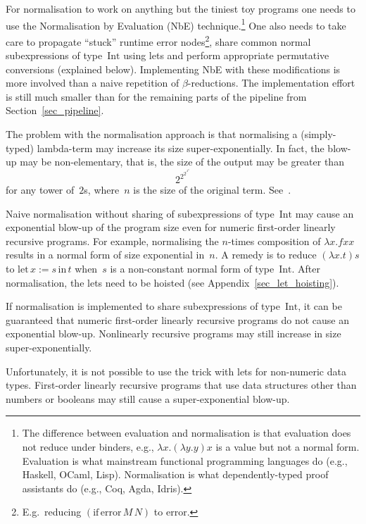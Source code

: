 \documentclass[
    9pt,            %
    techreport,        %
    affiltop,       %
]{art}
\begin{document}
For normalisation to work on anything but the tiniest toy programs one
needs to use the Normalisation by Evaluation (NbE)
technique.\footnote{The difference between evaluation and
normalisation is that evaluation does not reduce under binders, e.g.,
$\lambda x . (\lambda y . y) x$ is a value but not a normal
form. Evaluation is what mainstream functional programming languages
do (e.g., Haskell, OCaml, Lisp). Normalisation is what
dependently-typed proof assistants do (e.g., Coq, Agda, Idris).} One
also needs to take care to propagate ``stuck'' runtime error
nodes\footnote{E.g.~reducing $(\mathrm{if}\,\mathrm{error}\,M\,N)$ to
$\mathrm{error}$.}, share common normal subexpressions of
type~$\mathrm{Int}$ using lets and perform appropriate permutative conversions (explained below). Implementing NbE with these
modifications is more involved than a naive repetition of
$\beta$-reductions. The implementation effort
is still much smaller than for the remaining parts of the pipeline
from Section~\ref{sec_pipeline}.

The problem with the normalisation approach is that normalising a
(simply-typed) lambda-term may increase its size
super-exponentially. In fact, the blow-up may be non-elementary, that is,
the size of the output may be greater than
\[
2^{2^{2^{\vdots^{2^n}}}}
\]
for any tower of~$2$s, where~$n$ is the size of the original
term. See~\cite[Section~3.7]{lectures-curry-howard-isomorphism}.

Naive normalisation without sharing of subexpressions of type~$\mathrm{Int}$ may cause an exponential blow-up of the program size even for numeric first-order linearly recursive programs. For example, normalising the $n$-times composition of $\lambda x . f x x$ results in a normal form of size exponential in~$n$. A remedy is to reduce $(\lambda x . t) s$ to $\mathrm{let}\,x:=s\,\mathrm{in}\,t$ when~$s$ is a non-constant normal form of type~$\mathrm{Int}$. After normalisation, the lets need to be hoisted (see Appendix~\ref{sec_let_hoisting}).

If normalisation is implemented to share subexpressions of
type~$\mathrm{Int}$, it can be guaranteed that numeric first-order linearly recursive programs do not cause an exponential
blow-up. Nonlinearly recursive programs may still increase in size
super-exponentially.

Unfortunately, it is not possible to use the trick with lets for non-numeric data types. First-order linearly recursive
programs that use data structures other than numbers or booleans may still cause a super-exponential blow-up.
\end{document}
